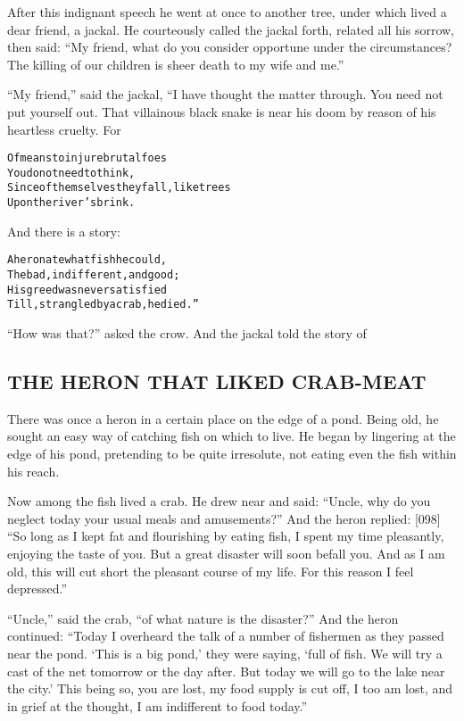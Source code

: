 \documentclass{article}
\renewenvironment{verbatim}{\begin{alltt}\normalfont\begin{centering}}{\end{centering}\end{alltt}}
\begin{document}
After this indignant speech he went at once to another tree, under
which lived a dear friend, a jackal. He courteously called the
jackal forth, related all his sorrow, then said:
``My friend, what do you consider opportune under the circumstances? The killing of our children is sheer death to my wife and me.''

``My friend,'' said the jackal, “I have thought the matter through.
You need not put yourself out. That villainous black snake is near
his doom by reason of his heartless cruelty. For

\begin{verbatim}
Of means to injure brutal foes
    You do not need to think,
Since of themselves they fall, like trees
    Upon the river's brink.
\end{verbatim}
And there is a story:

\begin{verbatim}
A heron ate what fish he could,
The bad, indifferent, and good;
His greed was never satisfied
Till, strangled by a crab, he died.”
\end{verbatim}
``How was that?'' asked the crow. And the jackal told the story of

\subsection{THE HERON THAT LIKED CRAB-MEAT}

There was once a heron in a certain place on the edge of a pond.
Being old, he sought an easy way of catching fish on which to live.
He began by lingering at the edge of his pond, pretending to be
quite irresolute, not eating even the fish within his reach.

Now among the fish lived a crab. He drew near and said:
``Uncle, why do you neglect today your usual meals and amusements?''
And the heron replied: [098]
``So long as I kept fat and flourishing by eating fish, I spent my time pleasantly, enjoying the taste of you. But a great disaster will soon befall you. And as I am old, this will cut short the pleasant course of my life. For this reason I feel depressed.''

``Uncle,'' said the crab, ``of what nature is the disaster?'' And
the heron continued:
``Today I overheard the talk of a number of fishermen as they passed near the pond. `This is a big pond,' they were saying, `full of fish. We will try a cast of the net tomorrow or the day after. But today we will go to the lake near the city.' This being so, you are lost, my food supply is cut off, I too am lost, and in grief at the thought, I am indifferent to food today.''
\end{document}
